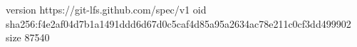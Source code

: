 version https://git-lfs.github.com/spec/v1
oid sha256:f4e2af04d7b1a1491ddd6d67d0c5caf4d85a95a2634ac78e211c0cf3dd499902
size 87540
